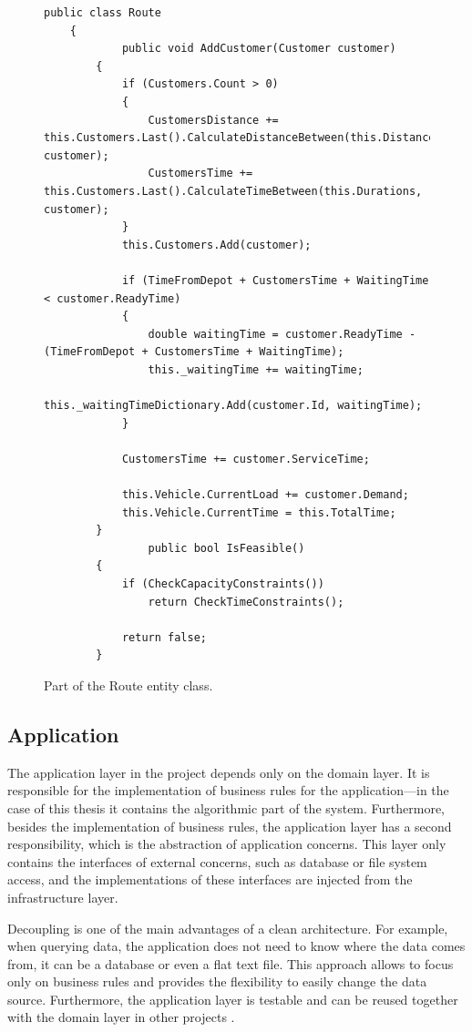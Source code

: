 \documentclass[a4paper,twoside,12pt]{book}
\begin{document}
\begin{figure}
\centering
\begin{lstlisting}
public class Route
    {
            public void AddCustomer(Customer customer)
        {
            if (Customers.Count > 0)
            {
                CustomersDistance += this.Customers.Last().CalculateDistanceBetween(this.Distances, customer);
                CustomersTime += this.Customers.Last().CalculateTimeBetween(this.Durations, customer);
            }
            this.Customers.Add(customer);

            if (TimeFromDepot + CustomersTime + WaitingTime < customer.ReadyTime)
            {
                double waitingTime = customer.ReadyTime - (TimeFromDepot + CustomersTime + WaitingTime);
                this._waitingTime += waitingTime;
                this._waitingTimeDictionary.Add(customer.Id, waitingTime);
            }

            CustomersTime += customer.ServiceTime;

            this.Vehicle.CurrentLoad += customer.Demand;
            this.Vehicle.CurrentTime = this.TotalTime;
        }
                public bool IsFeasible()
        {
            if (CheckCapacityConstraints())
                return CheckTimeConstraints();

            return false;
        }
\end{lstlisting}
\caption{Part of the Route entity class.}
\label{fig:routeMethod}
\end{figure}




\subsection{Application}

The application layer in the project depends only on the domain layer. It is responsible for the implementation of business rules for the application---in the case of this thesis it contains the algorithmic part of the system. Furthermore, besides the implementation of business rules, the application layer has a second responsibility, which is the abstraction of application concerns. This layer only contains the interfaces of external concerns, such as database or file system access, and the implementations of these interfaces are injected from the infrastructure layer. 

Decoupling is one of the main advantages of a clean architecture. For example, when querying data, the application does not need to know where the data comes from, it can be a database or even a flat text file. This approach allows to focus only on business rules and provides the flexibility to easily change the data source. Furthermore, the application layer is testable and can be reused together with the domain layer in other projects \cite{bib:cleanArchitectureApp}.
\end{document}
